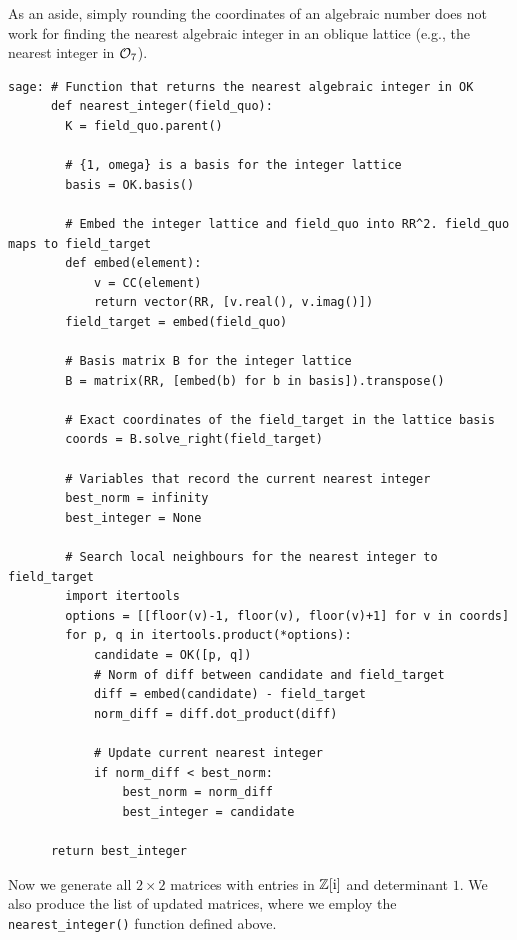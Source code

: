 \documentclass[runningheads]{llncs}
\begin{document}
As an aside, simply rounding the coordinates of an algebraic number does not work for finding the nearest algebraic integer in an oblique lattice (e.g., the nearest integer in \(\mathcal{O}_7\)).
\begin{lstlisting}
sage: # Function that returns the nearest algebraic integer in OK
      def nearest_integer(field_quo):
        K = field_quo.parent()
    
        # {1, omega} is a basis for the integer lattice
        basis = OK.basis()
    
        # Embed the integer lattice and field_quo into RR^2. field_quo maps to field_target
        def embed(element):
            v = CC(element) 
            return vector(RR, [v.real(), v.imag()])
        field_target = embed(field_quo)
    
        # Basis matrix B for the integer lattice
        B = matrix(RR, [embed(b) for b in basis]).transpose()
    
        # Exact coordinates of the field_target in the lattice basis
        coords = B.solve_right(field_target)
    
        # Variables that record the current nearest integer
        best_norm = infinity
        best_integer = None

        # Search local neighbours for the nearest integer to field_target
        import itertools
        options = [[floor(v)-1, floor(v), floor(v)+1] for v in coords]
        for p, q in itertools.product(*options):
            candidate = OK([p, q])
            # Norm of diff between candidate and field_target
            diff = embed(candidate) - field_target
            norm_diff = diff.dot_product(diff)

            # Update current nearest integer 
            if norm_diff < best_norm:
                best_norm = norm_diff
                best_integer = candidate
            
      return best_integer
\end{lstlisting}

Now we generate all \(2\times 2\) matrices with entries in \(\mathbb{Z}[\mathrm{i}]\) and determinant \(1\).  We also produce the list of updated matrices, where we employ the \verb|nearest_integer()| function defined above.
\end{document}
